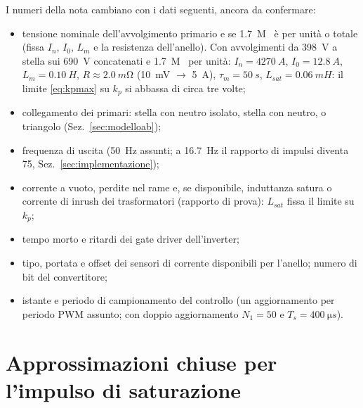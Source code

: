\documentclass[10pt,a4paper]{scrartcl}
\newcommand{\Ts}{T_s}
\newcommand{\Lm}{L_m}
\newcommand{\Lsat}{L_{sat}}
\newcommand{\Izero}{I_0}
\newcommand{\kp}{k_p}
\begin{document}
\begin{onehalfspace}
I numeri della nota cambiano con i dati seguenti, ancora da confermare:
\begin{itemize}[label=$\square$]
\item tensione nominale dell'avvolgimento primario e se \SI{1.7}{M\VA} è per unità o totale (fissa $I_n$, $\Izero$, $\Lm$ e la resistenza dell'anello). Con avvolgimenti da \SI{398}{V} a stella sui \SI{690}{V} concatenati e \SI{1.7}{M\VA} per unità: $I_n = \SI{4270}{A}$, $\Izero = \SI{12.8}{A}$, $\Lm = \SI{0.10}{H}$, $R \approx \SI{2.0}{m\ohm}$ (\SI{10}{mV} $\to$ \SI{5}{A}), $\tau_m = \SI{50}{s}$, $\Lsat = \SI{0.06}{mH}$: il limite \eqref{eq:kpmax} su $\kp$ si abbassa di circa tre volte;
\item collegamento dei primari: stella con neutro isolato, stella con neutro, o triangolo (Sez.~\ref{sec:modelloab});
\item frequenza di uscita (\SI{50}{Hz} assunti; a \SI{16.7}{Hz} il rapporto di impulsi diventa 75, Sez.~\ref{sec:implementazione});
\item corrente a vuoto, perdite nel rame e, se disponibile, induttanza satura o corrente di inrush dei trasformatori (rapporto di prova): $\Lsat$ fissa il limite su $\kp$;
\item tempo morto e ritardi dei gate driver dell'inverter;
\item tipo, portata e offset dei sensori di corrente disponibili per l'anello; numero di bit del convertitore;
\item istante e periodo di campionamento del controllo (un aggiornamento per periodo PWM assunto; con doppio aggiornamento $N_1 = 50$ e $\Ts = \SI{400}{\micro s}$).
\end{itemize}

\appendix
\section{Approssimazioni chiuse per l'impulso di saturazione}
\label{app:impulso}


\end{onehalfspace}
\end{document}
